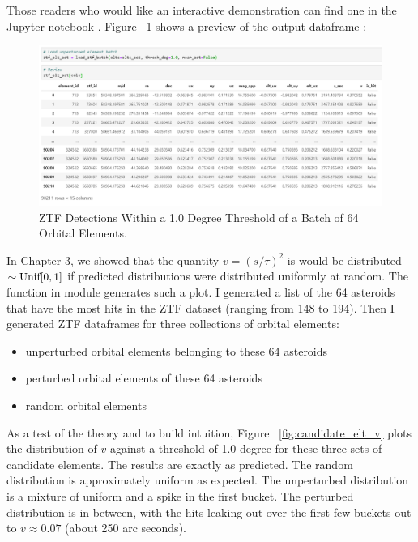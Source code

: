 Those readers who would like an interactive demonstration can find one in the Jupyter notebook .
Figure ~\ref{fig:ztf_elt_dataframe} shows a preview of the output dataframe :
\begin{figure}[hbt!]
\begin{center}
\includegraphics[width=1.0\textwidth]{../figs/elts/ztf_elt_dataframe.png}
\end{center}
\caption[ZTF Detections Within a 1.0 Degree Threshold of a Batch of 64 Orbital Elements]
{ZTF Detections Within a 1.0 Degree Threshold of a Batch of 64 Orbital Elements.}
\label{fig:ztf_elt_dataframe}
\end{figure}
In Chapter 3, we showed that the quantity $v = (s/\tau)^2$ is would be distributed $\sim \textnormal{Unif}[0,1]$
if predicted distributions were distributed uniformly at random.
The function  in module  generates such a plot.
I generated a list of the 64 asteroids that have the most hits in the ZTF dataset (ranging from 148 to 194).
Then I generated ZTF dataframes for three collections of orbital elements: 
\begin{itemize}
\item unperturbed orbital elements belonging to these 64 asteroids
\item perturbed orbital elements of these 64 asteroids
\item random orbital elements
\end{itemize}
As a test of the theory and to build intuition, Figure ~\ref{fig:candidate_elt_v} plots the distribution of $v$ 
against a threshold of 1.0 degree for these three sets of candidate elements.
The results are exactly as predicted.
The random distribution is approximately uniform as expected.
The unperturbed distribution is a mixture of uniform and a spike in the first bucket.
The perturbed distribution is in between, with the hits leaking out over the first few buckets out to $v \approx 0.07$ (about 250 arc seconds).
